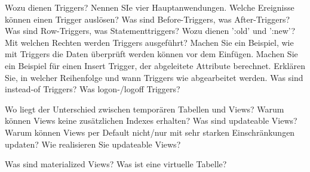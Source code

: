 \documentclass[ngerman,a4paper,12pt]{scrreprt}
\begin{document}
\olR
	\li Wozu dienen Triggers? Nennen SIe vier Hauptanwendungen.
	\li Welche Ereignisse können einen Trigger auslösen?
	\li Was sind Before-Triggers, was After-Triggers? Was sind Row-Triggers, was Statementtriggers?
	\li Wozu dienen ':old' und ':new'?
	\li Mit welchen Rechten werden Triggers ausgeführt?
	\li Machen Sie ein Beispiel, wie mit Triggers die Daten überprüft werden können vor dem Einfügen.
	\li Machen Sie ein Beispiel für einen Insert Trigger, der abgeleitete Attribute berechnet.
	\li Erklären Sie, in welcher Reihenfolge und wann Triggers wie abgearbeitet werden.
	\li Was sind instead-of Triggers? Was logon-/logoff Triggers?
\olS

\olR
	\li Wo liegt der Unterschied zwischen temporären Tabellen und Views?
	\li Warum können Views keine zusätzlichen Indexes erhalten?
	\li Was sind updateable Views? Warum können Views per Default nicht/nur mit sehr starken Einschränkungen updaten?
	\li Wie realisieren Sie updateable Views?
\olS

\olR
	\li Was sind materialized Views?
	\li Was ist eine virtuelle Tabelle?
\olS
\end{document}
